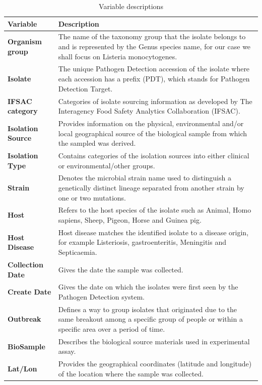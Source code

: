 \documentclass[
  10pt,
]{article}
\begin{document}
\begin{table}[H]

\caption{\label{tab:table-one}Variable descriptions}
\centering
\begin{tabular}[t]{>{}l>{\raggedright\arraybackslash}p{11cm}}
\toprule
\textbf{Variable} & \textbf{Description}\\
\midrule
\textbf{Organism group} & The name of the taxonomy group that the isolate belongs to and is represented by the Genus species name, for our case we shall focus on Listeria monocytogenes.\\
\textbf{Isolate} & The unique Pathogen Detection accession of the isolate  where each accession has a prefix (PDT), which stands for Pathogen Detection Target.\\
\textbf{IFSAC category} & Categories of isolate sourcing information as developed by The Interagency Food Safety Analytics Collaboration (IFSAC).\\
\textbf{Isolation Source} & Provides information on the physical, environmental and/or local geographical source of the biological sample from which the sampled was derived.\\
\textbf{Isolation Type} & Contains categories of the isolation sources into either clinical or environmental/other groups.\\
\addlinespace
\textbf{Strain} & Denotes the microbial strain name used to distinguish a genetically distinct lineage separated from another strain by one or two mutations.\\
\textbf{Host} & Refers to the host species of the isolate such as Animal, Homo sapiens, Sheep, Pigeon, Horse and Guinea pig.\\
\textbf{Host Disease} & Host disease matches the identified isolate to a disease origin, for example Listeriosis, gastroenteritis, Meningitis and Septicaemia.\\
\textbf{Collection Date} & Gives the date the sample was collected.\\
\textbf{Create Date} & Gives the date on which the isolates were first seen by the Pathogen Detection system.\\
\addlinespace
\textbf{Outbreak} & Defines a way to group isolates that originated due to the same breakout among a specific group of people or within a specific area over a period of time.\\
\textbf{BioSample} & Describes the biological source materials used in experimental assay.\\
\textbf{Lat/Lon} & Provides the geographical coordinates (latitude and longitude) of the location where the sample was collected.\\

\end{tabular}
\end{table}
\end{document}

